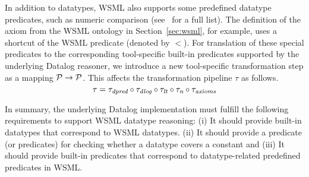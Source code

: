 In addition to datatypes, WSML also supports some predefined
datatype predicates, such as numeric comparison
(see~\cite{wsml-spec} for a full list). The definition of the
axiom  from the WSML
ontology in Section~\ref{sec:wsml}, for example, uses a shortcut
of the WSML  predicate (denoted by $<$). For
translation of these special predicates to the corresponding
tool-specific built-in predicates supported by the underlying
Datalog reasoner, we introduce a new tool-specific transformation
step \transdpred as a mapping $\P \rightarrow \P$. This affects
the transformation pipeline $\tau$ as follows. \compress
\begin{displaymath}
    \tau = \transdpred \circ \transdlog \circ \translt \circ \transnorm \circ
    \transax \compress
\end{displaymath}

In summary, the underlying Datalog implementation must fulfill the
following requirements to support WSML datatype reasoning: (i) It
should provide built-in datatypes that correspond to WSML
datatypes. (ii) It should provide a predicate (or predicates) for
checking whether a datatype covers a constant and (iii) It should
provide built-in predicates that correspond to datatype-related
predefined predicates in WSML.


